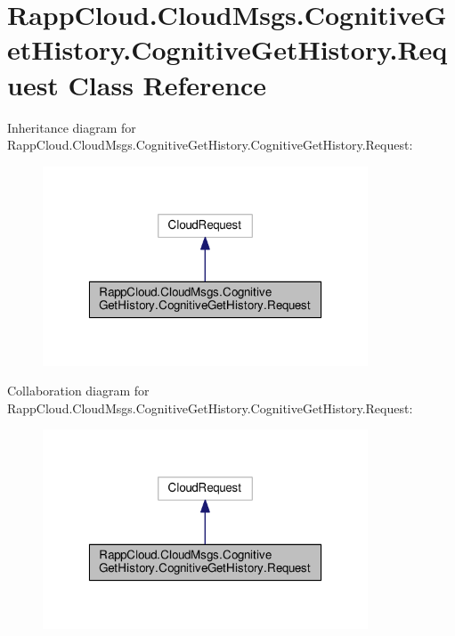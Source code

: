 \hypertarget{classRappCloud_1_1CloudMsgs_1_1CognitiveGetHistory_1_1CognitiveGetHistory_1_1Request}{\section{Rapp\-Cloud.\-Cloud\-Msgs.\-Cognitive\-Get\-History.\-Cognitive\-Get\-History.\-Request Class Reference}
\label{classRappCloud_1_1CloudMsgs_1_1CognitiveGetHistory_1_1CognitiveGetHistory_1_1Request}
}


Inheritance diagram for Rapp\-Cloud.\-Cloud\-Msgs.\-Cognitive\-Get\-History.\-Cognitive\-Get\-History.\-Request\-:
\nopagebreak
\begin{figure}[H]
\begin{center}
\leavevmode
\includegraphics[width=274pt]{classRappCloud_1_1CloudMsgs_1_1CognitiveGetHistory_1_1CognitiveGetHistory_1_1Request__inherit__graph}
\end{center}
\end{figure}


Collaboration diagram for Rapp\-Cloud.\-Cloud\-Msgs.\-Cognitive\-Get\-History.\-Cognitive\-Get\-History.\-Request\-:
\nopagebreak
\begin{figure}[H]
\begin{center}
\leavevmode
\includegraphics[width=274pt]{classRappCloud_1_1CloudMsgs_1_1CognitiveGetHistory_1_1CognitiveGetHistory_1_1Request__coll__graph}
\end{center}
\end{figure}
